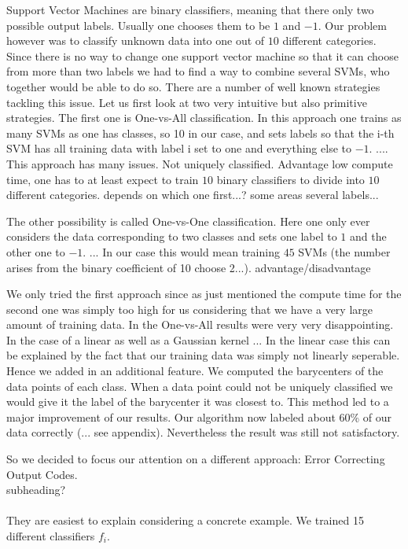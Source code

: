 Support Vector Machines are binary classifiers, meaning that there only two possible output labels. Usually one chooses them to be $1$ and $-1$. Our problem however was to classify unknown data into one out of $10$ different categories. Since there is no way to change one support vector machine so that it can choose from more than two labels we had to find a way to combine several SVMs, who together would be able to do so. There are a number of well known strategies tackling this issue. Let us first look at two very intuitive but also primitive strategies. The first one is One-vs-All classification. In this approach one trains as many SVMs as one has classes, so 10 in our case, and sets labels so that the i-th SVM has all training data with label i set to one and everything else to $-1$. .... This approach has many issues. Not uniquely classified. Advantage low compute time, one has to at least expect to train $10$ binary classifiers to divide into $10$ different categories. depends on which one first...? some areas several labels...  

The other possibility is called One-vs-One classification. Here one only ever considers the data corresponding to two classes and sets one label to $1$ and the other one to $-1$. ... 
In our case this would mean training $45$ SVMs (the number arises from the binary coefficient of 10 choose 2...). advantage/disadvantage

We only tried the first approach since as just mentioned the compute time for the second one was simply too high for us considering that we have a very large amount of training data. In the One-vs-All results were very very disappointing. In the case of a linear as well as a Gaussian kernel ... In the linear case this can be explained by the fact that our training data was simply not linearly seperable. 
Hence we added in an additional feature. We computed the barycenters of the data points of each class. When a data point could not be uniquely classified we would give it the label of the barycenter it was closest to. This method led to a major improvement of our results. Our algorithm now labeled about 60\% of our data correctly (... see appendix).  Nevertheless the result was still not satisfactory. 

So we decided to focus our attention on a different approach: Error Correcting Output Codes. 
\\
subheading? \\
\\
They are easiest to explain considering a concrete example. We trained 15 different classifiers $f_i$. 

